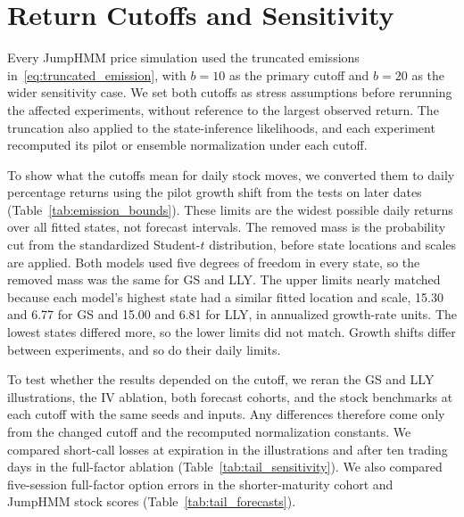 \clearpage
\section{Return Cutoffs and Sensitivity}\label{sec:truncated_emissions}

Every JumpHMM price simulation used the truncated emissions in~\eqref{eq:truncated_emission}, with $b=10$ as the primary cutoff and $b=20$ as the wider sensitivity case. We set both cutoffs as stress assumptions before rerunning the affected experiments, without reference to the largest observed return. The truncation also applied to the state-inference likelihoods, and each experiment recomputed its pilot or ensemble normalization under each cutoff.

To show what the cutoffs mean for daily stock moves, we converted them to daily percentage returns using the pilot growth shift from the tests on later dates (Table~\ref{tab:emission_bounds}). These limits are the widest possible daily returns over all fitted states, not forecast intervals. The removed mass is the probability cut from the standardized Student-$t$ distribution, before state locations and scales are applied. Both models used five degrees of freedom in every state, so the removed mass was the same for GS and LLY. The upper limits nearly matched because each model's highest state had a similar fitted location and scale, 15.30 and 6.77 for GS and 15.00 and 6.81 for LLY, in annualized growth-rate units. The lowest states differed more, so the lower limits did not match. Growth shifts differ between experiments, and so do their daily limits.

\begin{table}[H]
\centering
\caption{Daily return limits under the primary ($b=10$) and wider ($b=20$) cutoffs. The limits include the pilot growth shift from the tests on later dates and the $1/252$ year step. Removed mass is the probability excluded from the original Student-$t$ emission, in percent.}\label{tab:emission_bounds}

\end{table}

To test whether the results depended on the cutoff, we reran the GS and LLY illustrations, the IV ablation, both forecast cohorts, and the stock benchmarks at each cutoff with the same seeds and inputs. Any differences therefore come only from the changed cutoff and the recomputed normalization constants. We compared short-call losses at expiration in the illustrations and after ten trading days in the full-factor ablation (Table~\ref{tab:tail_sensitivity}). We also compared five-session full-factor option errors in the shorter-maturity cohort and JumpHMM stock scores (Table~\ref{tab:tail_forecasts}).

